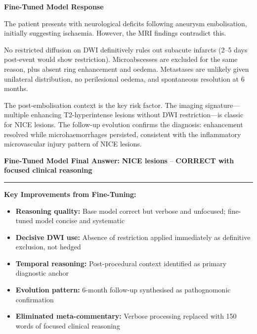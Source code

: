 \documentclass[10pt,journal,compsoc, onecolumn]{IEEEtran}
\begin{document}
\begin{casebox}
    \textbf{Fine-Tuned Model Response}

    \vspace{0.5em}
    The patient presents with neurological deficits following aneurysm embolisation, initially suggesting ischaemia. However, the MRI findings contradict this.

    \vspace{0.5em}
    \colorbox{yellow!30}{No restricted diffusion on DWI} definitively rules out subacute infarcts (2--5 days post-event would show restriction). Microabscesses are excluded for the same reason, plus absent ring enhancement and oedema. Metastases are unlikely given unilateral distribution, no perilesional oedema, and \colorbox{yellow!30}{spontaneous resolution at 6 months}.

    \vspace{0.5em}
    \colorbox{yellow!30}{The post-embolisation context is the key risk factor}. The imaging signature---multiple enhancing T2-hyperintense lesions without DWI restriction---is classic for NICE lesions. \colorbox{yellow!30}{The follow-up evolution confirms the diagnosis: enhancement resolved while microhaemorrhages persisted}, consistent with the inflammatory microvascular injury pattern of NICE lesions.

    \vspace{1em}
    \noindent\textbf{Fine-Tuned Model Final Answer:} \colorbox{green!30}{\textbf{NICE lesions}} -- \textbf{CORRECT with focused clinical reasoning}

    \vspace{1em}
    \hrule
    \vspace{1em}

    \textbf{Key Improvements from Fine-Tuning:}
    \begin{itemize}[leftmargin=*, noitemsep, topsep=2pt]
        \item \textbf{Reasoning quality:} Base model correct but verbose and unfocused; fine-tuned model concise and systematic
        \item \textbf{Decisive DWI use:} \colorbox{yellow!30}{Absence of restriction applied immediately} as definitive exclusion, not hedged
        \item \textbf{Temporal reasoning:} Post-procedural context identified as primary diagnostic anchor
        \item \textbf{Evolution pattern:} 6-month follow-up synthesised as pathognomonic confirmation
        \item \textbf{Eliminated meta-commentary:} Verbose processing replaced with 150 words of focused clinical reasoning
    \end{itemize}
\end{casebox}

\vspace{1em}
\end{document}
